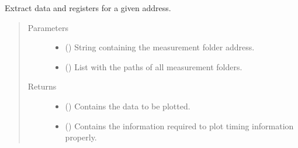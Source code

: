 \documentclass[letterpaper,10pt,english]{sphinxmanual}
\begin{document}

\begin{fulllineitems}
\label{\detokenize{tes:tes.traces.extract_data}}
\sphinxAtStartPar
Extract data and registers for a given address.
\begin{quote}\begin{description}
\item[{Parameters}] \leavevmode\begin{itemize}
\item {} 
\sphinxAtStartPar
{} () \textendash{} String containing the measurement folder address.

\item {} 
\sphinxAtStartPar
{} () \textendash{} List with the paths of all measurement folders.

\end{itemize}

\item[{Returns}] \leavevmode
\sphinxAtStartPar
\begin{itemize}
\item {} 
\sphinxAtStartPar
{} () \textendash{} Contains the data to be plotted.

\item {} 
\sphinxAtStartPar
{} () \textendash{} Contains the information required to plot timing information
properly.

\end{itemize}


\end{description}\end{quote}

\end{fulllineitems}

\end{document}

